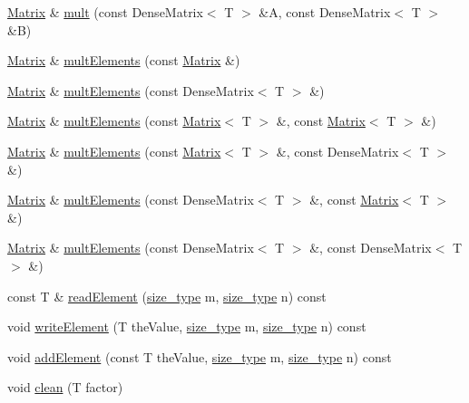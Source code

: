\begin{DoxyCompactItemize}
\item 
\hyperlink{classMatrix}{Matrix} \& \hyperlink{classMatrix_a05d60787d4280ce70e4bfdf9a778feec}{mult} (const Dense\-Matrix$<$ T $>$ \&A, const Dense\-Matrix$<$ T $>$ \&B)
\item 
\hyperlink{classMatrix}{Matrix} \& \hyperlink{classMatrix_a4e43697ca65c10f762b65da8b29a77fa}{mult\-Elements} (const \hyperlink{classMatrix}{Matrix} \&)
\item 
\hyperlink{classMatrix}{Matrix} \& \hyperlink{classMatrix_a8a9e005b12332e7cf6d6cb7f7eb05258}{mult\-Elements} (const Dense\-Matrix$<$ T $>$ \&)
\item 
\hyperlink{classMatrix}{Matrix} \& \hyperlink{classMatrix_acb7570b613ac336b4bf75f4ec67635e5}{mult\-Elements} (const \hyperlink{classMatrix}{Matrix}$<$ T $>$ \&, const \hyperlink{classMatrix}{Matrix}$<$ T $>$ \&)
\item 
\hyperlink{classMatrix}{Matrix} \& \hyperlink{classMatrix_a124251b89d28e38b5f8cf3a48b297008}{mult\-Elements} (const \hyperlink{classMatrix}{Matrix}$<$ T $>$ \&, const Dense\-Matrix$<$ T $>$ \&)
\item 
\hyperlink{classMatrix}{Matrix} \& \hyperlink{classMatrix_aa44908832fe9f0e3da401e207f8e071a}{mult\-Elements} (const Dense\-Matrix$<$ T $>$ \&, const \hyperlink{classMatrix}{Matrix}$<$ T $>$ \&)
\item 
\hyperlink{classMatrix}{Matrix} \& \hyperlink{classMatrix_abf8ae3fecd7d624fd33c1058cbfe413a}{mult\-Elements} (const Dense\-Matrix$<$ T $>$ \&, const Dense\-Matrix$<$ T $>$ \&)
\item 
const T \& \hyperlink{classMatrix_a1225e5428e19fc4ae3fcb664fbdecb6b}{read\-Element} (\hyperlink{lmx__mat__data_8h_a49b489a408a211a90e766329c0732d7b}{size\-\_\-type} m, \hyperlink{lmx__mat__data_8h_a49b489a408a211a90e766329c0732d7b}{size\-\_\-type} n) const 
\item 
void \hyperlink{classMatrix_a15b74964ba42fecd4965e0e5fd6643ca}{write\-Element} (T the\-Value, \hyperlink{lmx__mat__data_8h_a49b489a408a211a90e766329c0732d7b}{size\-\_\-type} m, \hyperlink{lmx__mat__data_8h_a49b489a408a211a90e766329c0732d7b}{size\-\_\-type} n) const 
\item 
void \hyperlink{classMatrix_a160e129270712b87969f7efee086fb53}{add\-Element} (const T the\-Value, \hyperlink{lmx__mat__data_8h_a49b489a408a211a90e766329c0732d7b}{size\-\_\-type} m, \hyperlink{lmx__mat__data_8h_a49b489a408a211a90e766329c0732d7b}{size\-\_\-type} n) const 
\item 
void \hyperlink{classMatrix_a1344fb1e24060a6be2e530447582affa}{clean} (T factor)

\end{DoxyCompactItemize}
